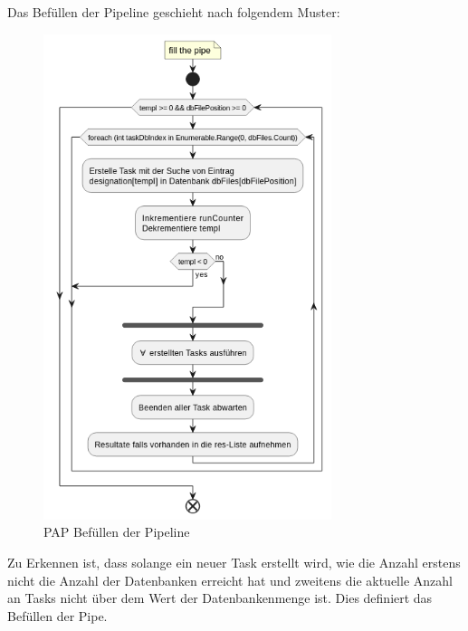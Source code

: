     \newpage
    Das Befüllen der Pipeline geschieht nach folgendem Muster:
    \begin{figure}[H]
        \centering
        \includegraphics[width=0.75\textwidth]{../pap/Case_A_k.png}
        \caption{\ac{PAP} Befüllen der Pipeline}
        \label{png:case_a}
    \end{figure}
    Zu Erkennen ist, dass solange ein neuer Task erstellt wird, wie die Anzahl erstens nicht die Anzahl der Datenbanken erreicht hat und zweitens die aktuelle Anzahl an Tasks nicht über dem Wert der Datenbankenmenge ist.
    Dies definiert das Befüllen der Pipe.

